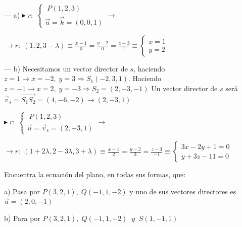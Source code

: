 \begin{proofw}\renewcommand{\qedsymbol}{$\diamond$}
	
	--- a) $\blacktriangleright\; r:\; \begin{cases} \; P(1,2,3) \\ \vec u=\vec k=(0,0,1) \end{cases} \to  $
	
\noindent  $\to r:\; (1,2,3-\lambda) \equiv \frac{x-1}{0}=\frac{y-2}{0}=\frac{z-3}{1} \equiv \begin{cases} x=1 \\ y=2 \end{cases}$
	
\noindent --- b) Necesitamos un vector director de $s$, haciendo $z=1 \to x=-2,\; y=3 \Rightarrow S_1(-2,3,1)$. Haciendo $z=-1 \to x=2,\; y=-3 \Rightarrow S_2=(2,-3,-1)$ Un vector director de $s$ será $\vec v_s=\overrightarrow{S_1S_2}=(4,-6,-2) \to (2,-3,1)$

\noindent $\blacktriangleright\;  r:\; \begin{cases} \;P(1,2,3) \\ \vec u=\vec v_s=(2,-3,1) \end{cases} \to $

\noindent $\to r:\;  (1+2\lambda,2-3\lambda,3+\lambda) \equiv \frac{x-1}{2}=\frac{y-2}{3}=\frac{z-3}{-1} \equiv \begin{cases} 3x-2y+1=0 \\ y+3z-11=0 \end{cases}$
\end{proofw}


\begin{ejre}
	Encuentra la ecuación del plano, en todas sus formas, que:
	
	a) Pasa por $P(3,2,1), \; Q(-1,1,-2)$ y uno de sus vectores directores es $\vec u=(2,0,-1)$
	
	b) Para por $P(3,2,1), \; Q(-1,1,-2) \;\; y \;\; S(1,-1,1)$
\end{ejre}

